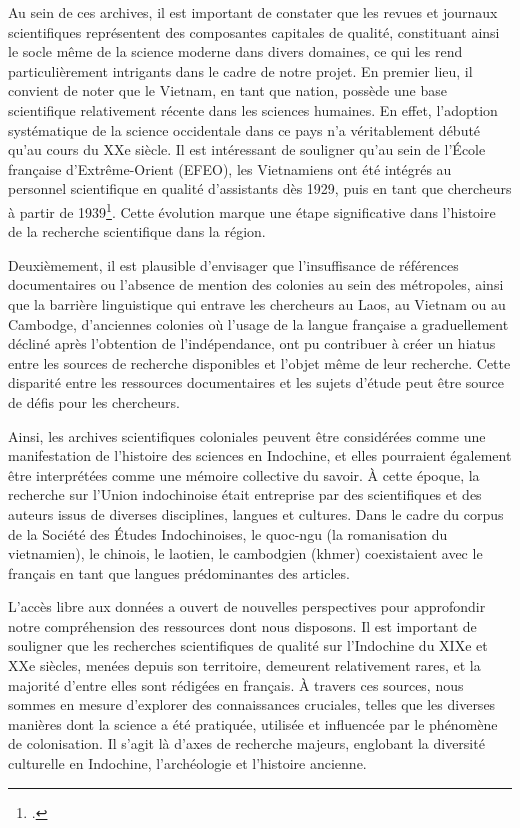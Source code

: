 Au sein de ces archives, il est important de constater que les revues et journaux scientifiques représentent des composantes capitales de qualité, constituant ainsi le socle même de la science moderne dans divers domaines, ce qui les rend particulièrement intrigants dans le cadre de notre projet. En premier lieu, il convient de noter que le Vietnam, en tant que nation, possède une base scientifique relativement récente dans les sciences humaines. En effet, l'adoption systématique de la science occidentale dans ce pays n'a véritablement débuté qu'au cours du XXe siècle. Il est intéressant de souligner qu'au sein de l'École française d'Extrême-Orient (EFEO), les Vietnamiens ont été intégrés au personnel scientifique en qualité d'assistants dès 1929, puis en tant que chercheurs à partir de 1939\footcites{04}. Cette évolution marque une étape significative dans l'histoire de la recherche scientifique dans la région. 

Deuxièmement, il est plausible d'envisager que l'insuffisance de références documentaires ou l'absence de mention des colonies au sein des métropoles, ainsi que la barrière linguistique qui entrave les chercheurs au Laos, au Vietnam ou au Cambodge, d'anciennes colonies où l'usage de la langue française a graduellement décliné après l'obtention de l'indépendance, ont pu contribuer à créer un hiatus entre les sources de recherche disponibles et l'objet même de leur recherche. Cette disparité entre les ressources documentaires et les sujets d'étude peut être source de défis pour les chercheurs.

Ainsi, les archives scientifiques coloniales peuvent être considérées comme une manifestation de l'histoire des sciences en Indochine, et elles pourraient également être interprétées comme une mémoire collective du savoir. À cette époque, la recherche sur l'Union indochinoise était entreprise par des scientifiques et des auteurs issus de diverses disciplines, langues et cultures. Dans le cadre du corpus de la Société des Études Indochinoises, le quoc-ngu (la romanisation du vietnamien), le chinois, le laotien, le cambodgien (khmer) coexistaient avec le français en tant que langues prédominantes des articles.

L'accès libre aux données a ouvert de nouvelles perspectives pour approfondir notre compréhension des ressources dont nous disposons. Il est important de souligner que les recherches scientifiques de qualité sur l'Indochine du XIXe et XXe siècles, menées depuis son territoire, demeurent relativement rares, et la majorité d'entre elles sont rédigées en français. À travers ces sources, nous sommes en mesure d'explorer des connaissances cruciales, telles que les diverses manières dont la science a été pratiquée, utilisée et influencée par le phénomène de colonisation. 
Il s'agit là d'axes de recherche majeurs, englobant la diversité culturelle en Indochine, l'archéologie et l'histoire ancienne. 

